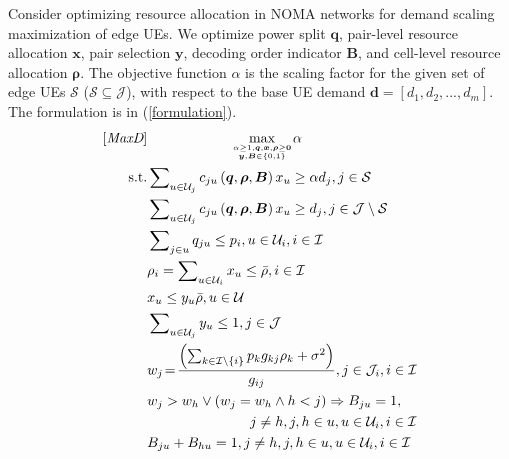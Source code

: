 \documentclass[10pt,journal,final,finalsubmission,twocolumn]{IEEEtran}
\begin{document}
Consider optimizing resource allocation in NOMA networks for demand scaling maximization of edge UEs. We optimize power split $\boldsymbol{q}$, pair-level resource allocation $\boldsymbol{x}$, pair selection $\boldsymbol{y}$, decoding order indicator $\boldsymbol{B}$, and cell-level resource allocation $\boldsymbol{\rho}$. The objective function $\alpha$ is the scaling factor for the given set of edge UEs $\mathcal{S}$ ($\mathcal{S}\subseteq \mathcal{J}$), with respect to the base UE demand $\boldsymbol{d}=[d_1,d_2,...,d_m]$. The formulation is in (\ref {formulation}).
\begin{subequations}\label{formulation}
\begin{align}
\textup{[{\em MaxD}]}&\ \ \ \ \ \ \ \ \ \ \ \ \ \ \ \ \ \ \underset{\alpha \geq 1,\boldsymbol{q},\boldsymbol{x},\boldsymbol{\rho}\geq \boldsymbol{0} \atop \boldsymbol{y},\boldsymbol{B}\in \left \{ 0,1 \right \}}{\max} \alpha  \\
\textup{ s.t.}& \sum\nolimits_{u\in {\mathcal{U}}_j} c_{ju}\left (\boldsymbol{q},\boldsymbol{ \rho}, \boldsymbol{B}\right )x_u\geq \alpha d_j, j\in \mathcal{S}\label{demand1}\\ 
& \sum\nolimits_{u\in {\mathcal{U}}_j} c_{ju}\left (\boldsymbol{q},\boldsymbol{ \rho}, \boldsymbol{B}\right )x_u\geq  d_j, j\in \mathcal{J} \setminus  \mathcal{S}\label{demand2}\\ 
&\sum \nolimits_{j \in u} q_{ju}\leq p_i,u\in {\mathcal{U}}_i, i\in \mathcal{I}  \label{limit1}\\
&\rho _i =\sum \nolimits_{u\in {\mathcal{U}}_i}x_u\leq \bar{\rho}, i\in \mathcal{I} \label{limit2}\\
&x_u\leq y_u \bar{\rho}, u\in \mathcal{U}\label{y1}\\
&\sum\nolimits_{u\in \mathcal{U}_j}y_u\leq1,j\in\mathcal{J}\label{y2}\\
&w_j\!=\!  \frac{\left(\sum \nolimits_{k \in \mathcal{I}\setminus \left \{ i \right \} }p_k g_{kj}\rho_k+\sigma ^2   \right)}{ g_{ij}},j \in \mathcal{J}_i ,i\in \mathcal{I}\label{order0}\\
&w_j>w_h\vee(w_j=w_h\wedge h < j)\Rightarrow B_{ju}=1,\notag\\
&\ \ \ \ \ \ \ \ \ \ \ \ \ \ \ \ \ \ \ \ \ \ j\neq h,j,h\in u, u\in \mathcal{U}_i, i\in \mathcal{I}\label{order1}\\
&B_{ju}+B_{hu}=1, j\neq h, j,h\in u, u\in \mathcal{U}_i, i\in \mathcal{I}\label{order2}
\end{align}
\end{subequations}
\end{document}

